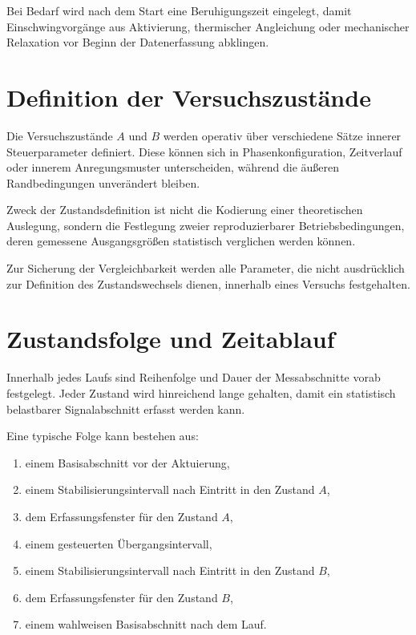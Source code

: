 \documentclass[12pt,a4paper]{report}
\begin{document}
Bei Bedarf wird nach dem Start eine Beruhigungszeit eingelegt, damit
Einschwingvorgänge aus Aktivierung, thermischer Angleichung oder
mechanischer Relaxation vor Beginn der Datenerfassung abklingen.

\section{Definition der Versuchszustände}

Die Versuchszustände $A$ und $B$ werden operativ über verschiedene Sätze
innerer Steuerparameter definiert. Diese können sich in
Phasenkonfiguration, Zeitverlauf oder innerem Anregungsmuster
unterscheiden, während die äußeren Randbedingungen unverändert bleiben.

Zweck der Zustandsdefinition ist nicht die Kodierung einer theoretischen
Auslegung, sondern die Festlegung zweier reproduzierbarer
Betriebsbedingungen, deren gemessene Ausgangsgrößen statistisch
verglichen werden können.

Zur Sicherung der Vergleichbarkeit werden alle Parameter, die nicht
ausdrücklich zur Definition des Zustandswechsels dienen, innerhalb eines
Versuchs festgehalten.

\section{Zustandsfolge und Zeitablauf}

Innerhalb jedes Laufs sind Reihenfolge und Dauer der Messabschnitte
vorab festgelegt. Jeder Zustand wird hinreichend lange gehalten, damit
ein statistisch belastbarer Signalabschnitt erfasst werden kann.

Eine typische Folge kann bestehen aus:

\begin{enumerate}
\item einem Basisabschnitt vor der Aktuierung,
\item einem Stabilisierungsintervall nach Eintritt in den Zustand $A$,
\item dem Erfassungsfenster für den Zustand $A$,
\item einem gesteuerten Übergangsintervall,
\item einem Stabilisierungsintervall nach Eintritt in den Zustand $B$,
\item dem Erfassungsfenster für den Zustand $B$,
\item einem wahlweisen Basisabschnitt nach dem Lauf.
\end{enumerate}
\end{document}
